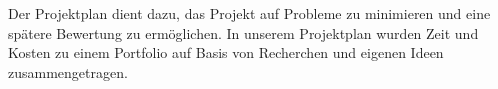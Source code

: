 \label{Projektplan}

Der Projektplan dient dazu, das Projekt auf Probleme zu minimieren und eine spätere Bewertung zu ermöglichen. In unserem Projektplan wurden Zeit und Kosten zu einem Portfolio auf Basis von Recherchen und eigenen Ideen zusammengetragen.